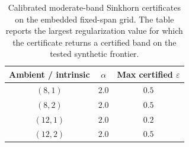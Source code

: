\begin{table}[!htbp]
\centering
\caption{Calibrated moderate-band Sinkhorn certificates on the embedded
fixed-span grid. The table reports the largest regularization value for which
the certificate returns a certified band on the tested synthetic frontier.}
\label{tab:sinkhorn_certified_band}
\begin{tabular}{ccc}
\toprule
Ambient / intrinsic & $\alpha$ & Max certified $\varepsilon$ \\
\midrule
$(8,1)$  & $2.0$ & $0.5$ \\
$(8,2)$  & $2.0$ & $0.5$ \\
$(12,1)$ & $2.0$ & $0.2$ \\
$(12,2)$ & $2.0$ & $0.5$ \\
\bottomrule
\end{tabular}
\end{table}
